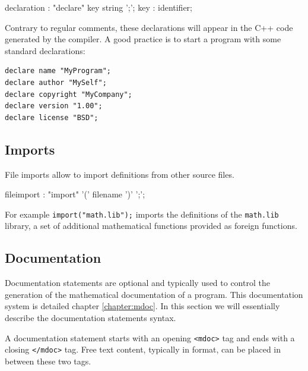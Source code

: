 \begin{rail}
declaration : "declare" key string ';';
key : identifier;
\end{rail}

Contrary to regular comments, these declarations will appear in the C++ code generated by the compiler. A good practice is to start a \faust program with some standard declarations:
\begin{lstlisting}
declare name "MyProgram";
declare author "MySelf";
declare copyright "MyCompany";
declare version "1.00";
declare license "BSD"; 
\end{lstlisting}


\subsection{Imports}

File imports allow to import definitions from other source files.  


\begin{rail}
fileimport : "import" '(' filename ')' ';';
\end{rail}

For example \lstinline{import("math.lib");} imports the definitions of the \lstinline{math.lib} library, a set of additional mathematical functions provided as foreign functions.


\subsection{Documentation}
\label{sec:documentation}

Documentation statements are optional and typically used to control the generation of the mathematical documentation of a \faust program. This documentation system is detailed chapter \ref{chapter:mdoc}. In this section we will essentially describe the documentation statements syntax.

A documentation statement starts with an opening \lstinline'<mdoc>' tag and ends with a closing \lstinline'</mdoc>' tag. Free text content, typically in \latex format, can be placed in between these two tags. 


